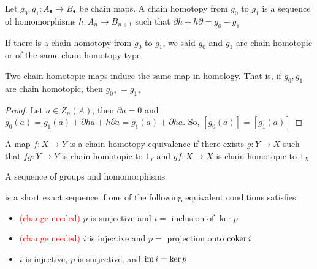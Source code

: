 \documentclass{report}
\begin{document}
\begin{definition}
    Let $g_0, g_1: A_\bullet \to B_\bullet$ be chain maps. A chain homotopy from $g_0$ to $g_1$ is a sequence of homomorphisms $h: A_n \to B_{n+1}$ such that $\partial h + h \partial = g_0 - g_1$
    \begin{center}
    \end{center}
    If there is a chain homotopy from $g_0$ to $g_1$, we said $g_0$ and $g_1$ are chain homotopic or of the same chain homotopy type.
\end{definition}

\begin{proposition}
    \label{prop_4}
    Two chain homotopic maps induce the same map in homology. That is, if $g_0, g_1$ are chain homotopic, then $g_{0*} = g_{1*}$
\end{proposition}

\begin{proof}
    Let $a \in Z_n(A)$, then $\partial a = 0$ and $g_0(a) = g_1(a) + \partial h a + h \partial a = g_1(a) + \partial h a$. So, $[g_0(a)] = [g_1(a)]$
\end{proof}

\begin{definition}
    A map $f: X \to Y$ is a chain homotopy equivalence if there exists $g: Y \to X$ such that $fg: Y \to Y$ is chain homotopic to $1_Y$ and $gf: X \to X$ is chain homotopic to $1_X$
\end{definition}


\begin{definition}
    A sequence of groups and homomorphisms
\begin{center}
\end{center}

is a short exact sequence if one of the following equivalent conditions satisfies

\begin{itemize}
    \item \textcolor{red}{(change needed)} $p$ is surjective and $i =$ inclusion of $\ker p$
    \item \textcolor{red}{(change needed)} $i$ is injective and $p =$ projection onto $\operatorname{coker} i$ 
    \item $i$ is injective, $p$ is surjective, and $\operatorname{im} i = \ker p$
\end{itemize}
 
\end{definition}
\end{document}
